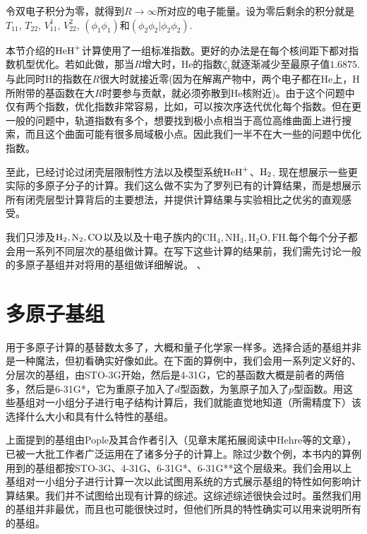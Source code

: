 令双电子积分为零，就得到$R\to\infty$所对应的电子能量。设为零后剩余的积分就是$T_{11}$, $T_{22}$, $V_{11}^1$, $V_{22}^2$, $(\phi_1\phi_1)$和$(\phi_2\phi_2|\phi_2\phi_2)$.

本节介绍的$\mathrm{HeH}^+$计算使用了一组标准指数。更好的办法是在每个核间距下都对指数机型优化。若如此做，那当$R$增大时，$\text{He}$的指数$\zeta_1$就逐渐减少至最原子值$1.6875$. 与此同时$\text{H}$的指数在$R$很大时就接近零(因为在解离产物中，两个电子都在$\text{He}$上，$\text{H}$所附带的基函数在大$R$时要参与贡献，就必须弥散到$\text{He}$核附近)。由于这个问题中仅有两个指数，优化指数非常容易，比如，可以按次序迭代优化每个指数。但在更一般的问题中，轨道指数有多个，想要找到极小点相当于高位高维曲面上进行搜索，而且这个曲面可能有很多局域极小点。因此我们一半不在大一些的问题中优化指数。

至此，已经讨论过闭壳层限制性\hft 方法以及模型系统$\mathrm{HeH}^+$、$\mathrm{H}_2$, 现在想展示一些更实际的多原子分子的计算。我们这么做不实为了罗列已有的计算结果，而是想展示所有闭壳层\hft 型计算背后的主要想法，并提供计算结果与实验相比之优劣的直观感受。

我们只涉及$\mathrm{H}_2, \text{N}_2, \text{CO}$以及以及十电子族内的$\text{CH}_4, \text{NH}_3, \text{H}_2\text{O}, \text{FH}$.每个每个分子都会用一系列不同层次的基组做计算。在写下这些计算的结果前，我们需先讨论一般的多原子基组并对将用的基组做详细解说。
、
\section{多原子基组}
用于多原子计算的基替数太多了，大概和量子化学家一样多。选择合适的基组并非是一种魔法，但初看确实好像如此。在下面的算例中，我们会用一系列定义好的、分层次的基组，由STO-3G开始，然后是4-31G，它的基函数大概是前者的两倍多，然后是6-31G*，它为重原子加入了$d$型函数，为氢原子加入了$p$型函数。用这些基组对一小组分子进行电子结构计算后，我们就能直觉地知道（所需精度下）该选择什么大小和具有什么特性的基组。

上面提到的基组由Pople及其合作者引入（见章末尾拓展阅读中Hehre等的文章），已被一大批工作者广泛运用在了诸多分子的计算上。除过少数个例，本书内的算例用到的基组都按STO-3G、4-31G、6-31G*、6-31G**这个层级来。我们会用以上基组对一小组分子进行计算一次以此试图用系统的方式展示基组的特性如何影响计算结果。我们并不试图给出现有计算的综述。这综述综述很快会过时。虽然我们用的基组并非最优，而且也可能很快过时，但他们所具的特性确实可以用来说明所有的基组。


